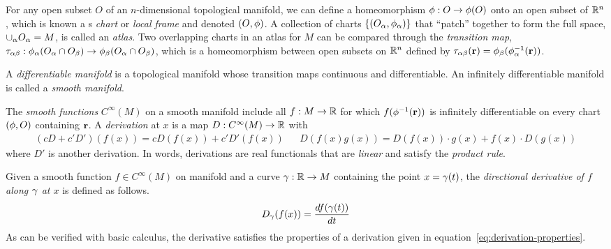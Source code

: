 \documentclass[11pt]{article}
\numberwithin{equation}{section}
\begin{document}
\begin{dfn}
For any open subset $O$ of an $n$-dimensional topological manifold, we can define a homeomorphism $\phi :O\rightarrow\phi (O)$ onto an open subset of $\mathbb{R}^n$, which is known a s \textit{chart} or \textit{local frame} and denoted $(O, \phi )$.
A collection of charts $\{(O_{\alpha },\phi _{\alpha })\}$ that ``patch'' together to form the full space, $\cup_{\alpha } O_{\alpha }=M$, is called an \textit{atlas}.
Two overlapping charts in an atlas for $M$ can be compared through the \textit{transition map},
$
  \tau _{\alpha \beta }
:
  \phi _{\alpha }(O_{\alpha }\cap O_{\beta })\rightarrow \phi _{\beta }(O_{\alpha }\cap O_{\beta })
$,
which is a homeomorphism between open subsets on $\mathbb{R}^n$ defined by
$
  \tau _{\alpha \beta }(\mathbf{r})
=
  \phi _{\beta }(\phi _{\alpha }^{-1}(\mathbf{r}))
$.
\end{dfn}

\begin{dfn}
A \textit{differentiable manifold} is a topological manifold whose transition maps continuous and differentiable.
An infinitely differentiable manifold is called a \textit{smooth manifold}.
\end{dfn}

\begin{dfn}
The \textit{smooth functions} $C^\infty(M)$ on a smooth manifold include all $f:M\rightarrow\mathbb{R}$ for which $f(\phi ^{-1}(\mathbf{r}))$ is infinitely differentiable on every chart $(\phi ,O)$ containing $\mathbf{r}$.
A \textit{derivation} at $x$ is a map $D:C^{\infty}(M)\rightarrow \mathbb{R}$ with
\begin{align}
\label{eq:derivation-properties}
  (cD + c'D')(f(x))
=
  c D(f(x))
+
  c' D'(f(x))
&&
  D(f(x)g(x))
=
  D(f(x))\cdot g(x)
+
  f(x)\cdot D(g(x))
\end{align}
where $D'$ is another derivation.
In words, derivations are real functionals that are \textit{linear} and satisfy the \textit{product rule}.
\end{dfn}

\begin{ex}
Given a smooth function $f\in C^\infty(M)$ on manifold and a curve $\gamma :\mathbb{R}\rightarrow M$ containing the point $x=\gamma (t)$, the \textit{directional derivative of $f$ along $\gamma $ at $x$} is defined as follows.
\begin{align}
  D_{\gamma }(f(x))
=
  \frac {d f(\gamma (t))}{d t}
\end{align}
As can be verified with basic calculus, the derivative satisfies the properties of a derivation given in equation~\ref{eq:derivation-properties}.
\end{ex}
\end{document}
